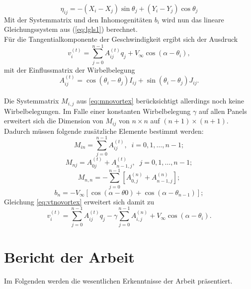 \begin{equation}
\label{eq:eta}
\eta_{ij} =  -(X_i - X_j) \sin \theta _j + (Y_i - Y_j) \cos \theta _j
\end{equation}
Mit der Systemmatrix und den Inhomogenitäten $b_i$ wird nun das lineare Gleichungssystem aus (\ref{eq:lgls1}) berechnet. \\
Für die Tangentialkomponente der Geschwindigkeit ergibt sich der Ausdruck
\begin{equation}
\label{eq:vtnovortex}
v_i^{(t)} =  \sum_{j=0}^{n-1} A_{ij}^{(t)} q_j + V_{\infty} \cos{(\alpha - \theta_i)},
\end{equation}
mit der Einflussmatrix der Wirbelbelegung
\begin{equation}
\label{eq:At}
A_{ij}^{(t)} =  \cos{(\theta _i - \theta _j)} I_{ij} + \sin{(\theta _i - \theta _j)} J_{ij}.
\end{equation}
\\
Die Systemmatrix $M_{i,j}$ aus \eqref{eq:mnovortex} berücksichtigt allerdings noch keine Wirbelbelegungen. Im Falle einer konstanten Wirbelbelegung $\gamma$ auf allen Panels erweitert sich die Dimension von $M_{ij}$ von $n \times n$ auf $(n+1) \times (n+1)$. Dadurch müssen folgende zusätzliche Elemente bestimmt werden:
\begin{equation}
M_{in} =  \sum_{j=0}^{n-1} A_{ij}^{(t)}, \;\; i=0,1,\ldots, n-1;
\end{equation}
\begin{equation}
M_{nj} =  A_{0j}^{(t)} + A_{n-1,j}^{(t)}, \;\; j =0,1,\ldots, n-1;
\end{equation}
\begin{equation}
M_{n,n} =  - \sum_{j=0}^{n-1} \left[ A_{0,j}^{(n)} + A_{n-1,j}^{(n)}\right];
\end{equation}
\begin{equation}
b_n =  -V_{\infty} [\cos{(\alpha -\theta 0)} + \cos{(\alpha -\theta _{n-1})}];
\end{equation}
Gleichung \eqref{eq:vtnovortex} erweitert sich damit zu
\begin{equation}
\label{eq:vtvortex}
v_i^{(t)} =  \sum_{j=0}^{n-1} A_{ij}^{(t)} q_j - \gamma \sum_{j=0}^{n-1}A_{i,j}^{(n)} + V_{\infty} \cos{(\alpha - \theta_i)}.
\end{equation}
\cite{Hess:1966} \cite{Cebeci:1999}
\newpage
\chapter{Bericht der Arbeit}
Im Folgenden werden die wesentlichen Erkenntnisse der Arbeit präsentiert.
